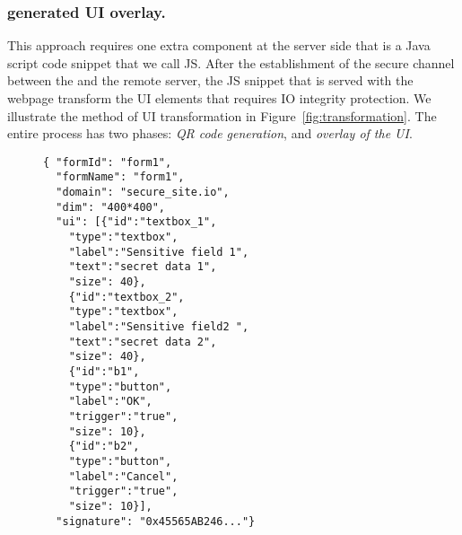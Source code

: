\subsubsection{\device generated UI overlay.} \label{sec:systemDesign:transformation:overlay} This approach requires one extra component at the server side that is a Java script code snippet that we call \name JS. After the establishment of the secure channel between the \device and the remote server, the \name JS snippet that is served with the webpage transform the UI elements that requires IO integrity protection. We illustrate the method of UI transformation in Figure~\ref{fig:transformation}. The entire process has two phases: \emph{QR code generation}, and \emph{overlay of the UI}.



\begin{figure}[t]
\begin{lstlisting}[mathescape=true]
{ "formId": "form1",
  "formName": "form1",
  "domain": "secure_site.io",
  "dim": "400*400",
  "ui": [{"id":"textbox_1",
  	"type":"textbox",
	"label":"Sensitive field 1",
	"text":"secret data 1",
	"size": 40},
	{"id":"textbox_2",
	"type":"textbox",
	"label":"Sensitive field2 ",
	"text":"secret data 2",
	"size": 40},
	{"id":"b1",
	"type":"button",
	"label":"OK",
	"trigger":"true",
	"size": 10},	
	{"id":"b2",
	"type":"button",
	"label":"Cancel",
	"trigger":"true",
	"size": 10}],
  "signature": "0x45565AB246..."}
\end{lstlisting}
\end{figure}

% 


